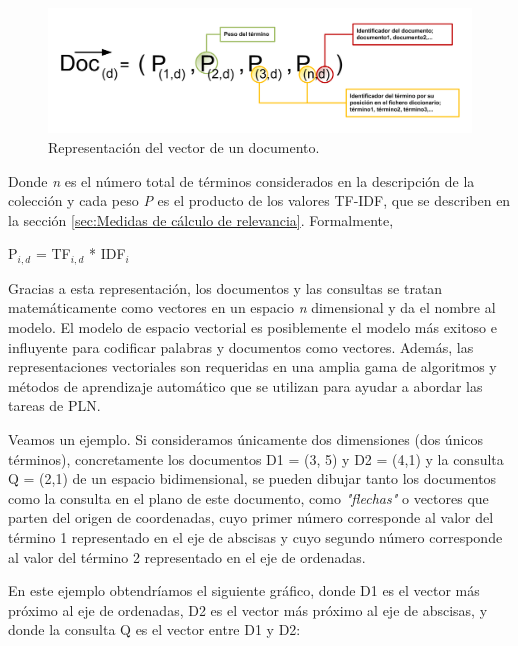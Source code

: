 \documentclass[titlepage]{article}
\begin{document}
\begin{figure}[h]
	\begin{center}
		\includegraphics*[scale=0.7]{formula_vector.png}
	\end{center}
	\caption{Representación del vector de un documento.}
	\label{fig: Figure 6}
\end{figure}

Donde \textit{n} es el número total de términos considerados en la descripción de la colección y cada peso \textit{P} es el producto de los valores TF-IDF\label{TF-IDF}, que se describen en la sección \ref{sec:Medidas de cálculo de relevancia}. Formalmente,

\begin{center}
	P$_{i, d}$ = TF$_{i, d}$ * IDF$_{i}$
\end{center}

Gracias a esta representación, los documentos y las consultas se tratan matemáticamente como vectores en un espacio \textit{n} dimensional y da el nombre al modelo. El modelo de espacio vectorial es posiblemente el modelo más exitoso e influyente para codificar palabras y documentos como vectores. Además, las representaciones vectoriales son requeridas en una amplia gama de algoritmos y métodos de aprendizaje automático que se utilizan para ayudar a abordar las tareas de PLN.

Veamos un ejemplo. Si consideramos únicamente dos dimensiones (dos únicos términos), concretamente los documentos D1 = (3, 5) y D2 = (4,1) y la consulta Q = (2,1) de un espacio bidimensional, se pueden dibujar tanto los documentos como la consulta en el plano de este documento, como \textit{"flechas"} o vectores que parten del origen de coordenadas, cuyo primer número corresponde al valor del término 1 representado en el eje de abscisas y cuyo segundo número corresponde al valor del término 2 representado en el eje de ordenadas. 

\newpage
En este ejemplo obtendríamos el siguiente gráfico, donde D1 es el vector más próximo al eje de ordenadas, D2 es el vector más próximo al eje de abscisas, y donde la consulta Q es el vector entre D1 y D2:
\end{document}
